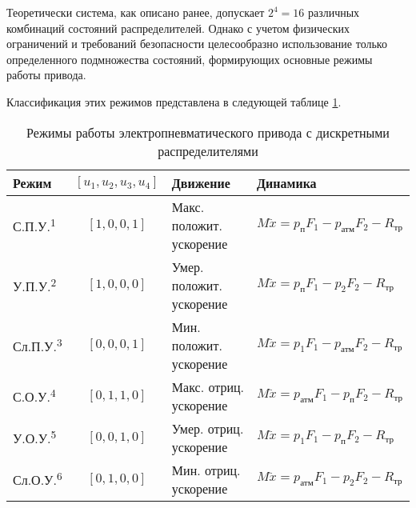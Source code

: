 Теоретически система, как описано ранее, допускает $2^4 = 16$ различных комбинаций состояний распределителей.
Однако с учетом физических ограничений и требований безопасности целесообразно использование только определенного
подмножества состояний, формирующих основные режимы работы привода.

Классификация этих режимов представлена в следующей таблице \ref{tab:operation_modes}.

\begin{table}[htbp]
	\centering
	\caption{Режимы работы электропневматического привода с дискретными распределителями}
	\label{tab:operation_modes}
	\small
	\begin{tabular}{lcll}
		\midrule
		\textbf{Режим}             & $[u_1,u_2,u_3,u_4]$ & \textbf{Движение} & \textbf{Динамика} \\
		\midrule
		С.П.У.\textsuperscript{1}  & $[1,0,0,1]$         &
		Макс. положит. ускорение   &
		$M\ddot{x} = p_\text{п}F_1 - p_\text{атм}F_2 - R_\text{тр}$                              \\

		У.П.У.\textsuperscript{2}  & $[1,0,0,0]$         &
		Умер. положит. ускорение   &
		$M\ddot{x} = p_\text{п}F_1 - p_2F_2 - R_\text{тр}$                                       \\

		Сл.П.У.\textsuperscript{3} & $[0,0,0,1]$         &
		Мин. положит. ускорение    &
		$M\ddot{x} = p_1F_1 - p_\text{атм}F_2 - R_\text{тр}$                                     \\

		С.О.У.\textsuperscript{4}  & $[0,1,1,0]$         &
		Макс. отриц. ускорение     &
		$M\ddot{x} = p_\text{атм}F_1 - p_\text{п}F_2 - R_\text{тр}$                              \\

		У.О.У.\textsuperscript{5}  & $[0,0,1,0]$         &
		Умер. отриц. ускорение     &
		$M\ddot{x} = p_1F_1 - p_\text{п}F_2 - R_\text{тр}$                                       \\

		Сл.О.У.\textsuperscript{6} & $[0,1,0,0]$         &
		Мин. отриц. ускорение      &
		$M\ddot{x} = p_\text{атм}F_1 - p_2F_2 - R_\text{тр}$                                     \\


\end{tabular}
\end{table}
